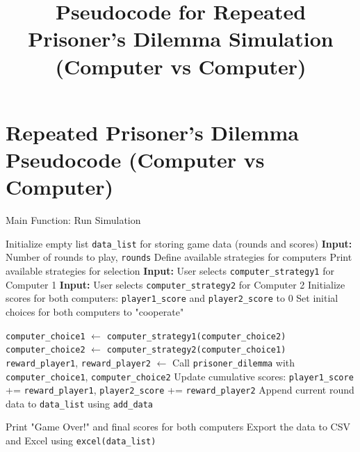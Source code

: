 \documentclass{article}
\begin{document}
\title{Pseudocode for Repeated Prisoner's Dilemma Simulation (Computer vs Computer)}
\author{}
\date{}
\maketitle

\section*{Repeated Prisoner's Dilemma Pseudocode (Computer vs Computer)}

\begin{algorithm}[H]
\caption{Main Function: Run Simulation}
\begin{algorithmic}[1]
\STATE Initialize empty list \texttt{data\_list} for storing game data (rounds and scores)
\STATE \textbf{Input:} Number of rounds to play, \texttt{rounds}
\STATE Define available strategies for computers
\STATE Print available strategies for selection
\STATE \textbf{Input:} User selects \texttt{computer\_strategy1} for Computer 1
\STATE \textbf{Input:} User selects \texttt{computer\_strategy2} for Computer 2
\STATE Initialize scores for both computers: \texttt{player1\_score} and \texttt{player2\_score} to 0
\STATE Set initial choices for both computers to "cooperate"

  
    \STATE \texttt{computer\_choice1} $\gets$ \texttt{computer\_strategy1(computer\_choice2)}  
    \STATE \texttt{computer\_choice2} $\gets$ \texttt{computer\_strategy2(computer\_choice1)}  
    \STATE \texttt{reward\_player1}, \texttt{reward\_player2} $\gets$ Call \texttt{prisoner\_dilemma} with \texttt{computer\_choice1}, \texttt{computer\_choice2}
    \STATE Update cumulative scores: \texttt{player1\_score} += \texttt{reward\_player1}, \texttt{player2\_score} += \texttt{reward\_player2}
    \STATE Append current round data to \texttt{data\_list} using \texttt{add\_data}
\ENDFOR

\STATE Print "Game Over!" and final scores for both computers
\STATE Export the data to CSV and Excel using \texttt{excel(data\_list)}
\end{algorithmic}
\end{algorithm}
\end{document}
